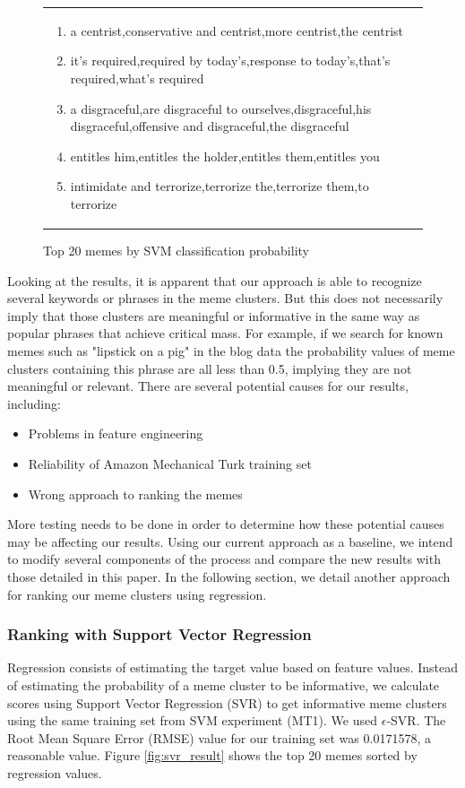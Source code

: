 \documentclass{sig-alternate}
\begin{document}
\begin{figure}[htb]
\begin{center}
{\begin{tabular}{p{16cm}}
\begin{enumerate}
\item a centrist,conservative and centrist,more centrist,the centrist
\item it's required,required by today's,response to today's,that's required,what's required
\item a disgraceful,are disgraceful to ourselves,disgraceful,his disgraceful,offensive and disgraceful,the disgraceful
\item entitles him,entitles the holder,entitles them,entitles you
\item intimidate and terrorize,terrorize the,terrorize them,to terrorize
\end{enumerate}

\end{tabular}
}
\caption{Top 20 memes by SVM classification probability}
\label{fig:svm_result}
\end{center}
\end{figure}

Looking at the results, it is apparent that our approach is able to recognize several keywords or phrases in the meme clusters. But this does not necessarily imply that those clusters are meaningful or informative in the same way as popular phrases that achieve critical mass. For example, if we search for known memes such as "lipstick on a pig" in the blog data the probability values of meme clusters containing this phrase are all less than 0.5, implying they are not meaningful or relevant. There are several potential causes for our results, including:
\begin{itemize}
 \item Problems in feature engineering
 \item Reliability of Amazon Mechanical Turk training set
 \item Wrong approach to ranking the memes
\end{itemize}

More testing needs to be done in order to determine how these potential causes may be affecting our results. Using our current approach as a baseline, we intend to modify several components of the process and compare the new results with those detailed in this paper. In the following section, we detail another approach for ranking our meme clusters using regression.

\subsubsection{Ranking with Support Vector Regression}
Regression consists of estimating the target value based on feature values. Instead of estimating the probability of a meme cluster to be informative, we calculate scores using Support Vector Regression (SVR) to get informative meme clusters using the same training set from SVM experiment (MT1). We used $\epsilon$-SVR. The Root Mean Square Error (RMSE) value for our training set was 0.0171578, a reasonable value. Figure \ref{fig:svr_result} shows the top 20 memes sorted by regression values.
\end{document}
